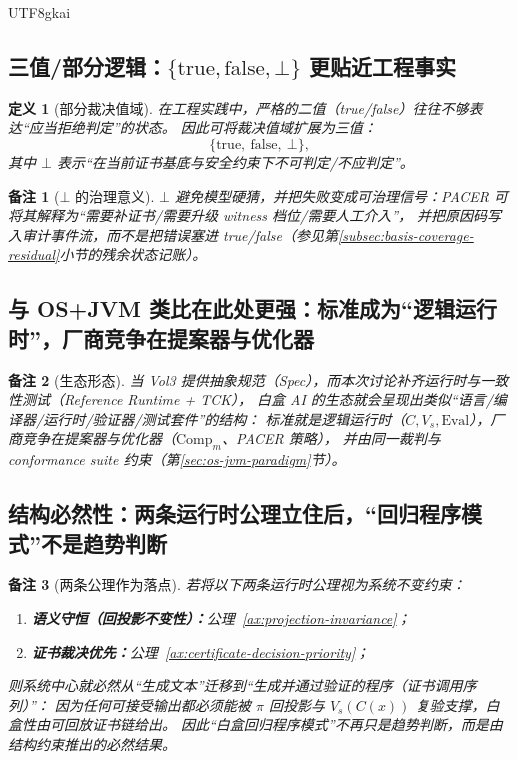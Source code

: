 \documentclass[12pt]{article}
\newtheorem{definition}{定义}[section]
\newtheorem{remark}{备注}[section]
\begin{document}
\begin{CJK*}{UTF8}{gkai}
\subsection{三值/部分逻辑：\texorpdfstring{$\{\mathrm{true},\mathrm{false},\bot\}$}{\{true,false,⊥\}} 更贴近工程事实}
\label{subsec:three-valued-logic}

\begin{definition}[部分裁决值域]
在工程实践中，严格的二值（true/false）往往不够表达“应当拒绝判定”的状态。
因此可将裁决值域扩展为三值：
\[
\{\mathrm{true},\ \mathrm{false},\ \bot\},
\]
其中 $\bot$ 表示“在当前证书基底与安全约束下不可判定/不应判定”。
\end{definition}

\begin{remark}[\texorpdfstring{$\bot$}{⊥} 的治理意义]
$\bot$ 避免模型硬猜，并把失败变成可治理信号：PACER 可将其解释为“需要补证书/需要升级 witness 档位/需要人工介入”，
并把原因码写入审计事件流，而不是把错误塞进 true/false（参见第\ref{subsec:basis-coverage-residual}小节的残余状态记账）。
\end{remark}

\subsection{与 OS+JVM 类比在此处更强：标准成为“逻辑运行时”，厂商竞争在提案器与优化器}
\label{subsec:osjvm-stronger}

\begin{remark}[生态形态]
当 Vol3 提供抽象规范（Spec），而本次讨论补齐运行时与一致性测试（Reference Runtime + TCK），
白盒 AI 的生态就会呈现出类似“语言/编译器/运行时/验证器/测试套件”的结构：
标准就是逻辑运行时（$C,V_s,\mathrm{Eval}$），厂商竞争在提案器与优化器（$\mathrm{Comp}_m$、PACER 策略），
并由同一裁判与 conformance suite 约束（第\ref{sec:os-jvm-paradigm}节）。
\end{remark}

\subsection{结构必然性：两条运行时公理立住后，“回归程序模式”不是趋势判断}
\label{subsec:structural-necessity}

\begin{remark}[两条公理作为落点]
若将以下两条运行时公理视为系统不变约束：
\begin{enumerate}
  \item \textbf{语义守恒（回投影不变性）：}公理~\ref{ax:projection-invariance}；
  \item \textbf{证书裁决优先：}公理~\ref{ax:certificate-decision-priority}；
\end{enumerate}
则系统中心就必然从“生成文本”迁移到“生成并通过验证的程序（证书调用序列）”：
因为任何可接受输出都必须能被 $\pi$ 回投影与 $V_s(C(x))$ 复验支撑，白盒性由可回放证书链给出。
因此“白盒回归程序模式”不再只是趋势判断，而是由结构约束推出的必然结果。
\end{remark}


\end{CJK*}
\end{document}
